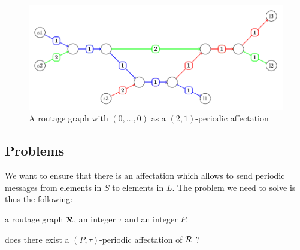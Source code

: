 \documentclass[a4paper,10pt]{article}
\begin{document}
%       
%       
      \begin{figure}[h]
       \begin{center}
      \includegraphics[scale=0.7]{Fig5.pdf}
      \end{center}
       \caption{A routage graph with $(0,\dots,0)$ as a $(2,1)$-periodic affectation}
      \end{figure}




   \subsection{Problems}

    We want to ensure that there is an affectation which allows to send periodic messages from elements in $S$ to elements in $L$.
    The problem we need to solve is thus the following:
    


       a routage graph $\cal R$, an integer $\tau$ and an integer $P$.

       does there exist a $(P,\tau)$-periodic affectation of $\cal R$ ?
\end{document}

